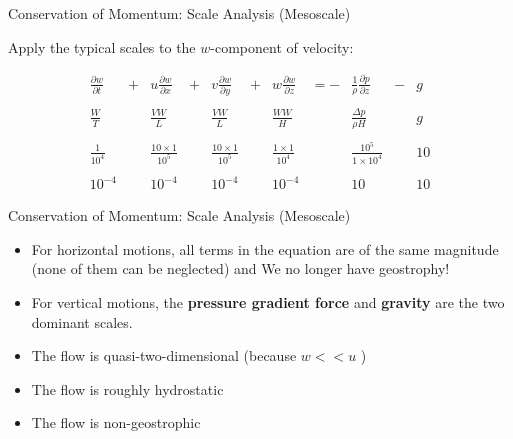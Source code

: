 \begin{frame}{Conservation of Momentum: Scale Analysis (Mesoscale)}

Apply the typical scales to the $w$-component of velocity:

\begin{align*}
&\frac{\partial w}{\partial t}& + &u \frac{\partial w}{\partial x}& + &v \frac{\partial w}{\partial y}&+ &w \frac{\partial w}{\partial z}& = -& \frac{1}{\rho} \frac{\partial p}{\partial z}& - &g& \\\\
&\frac{W}{T}&  &\frac{VW}{L}& &\frac{VW}{L}& &\frac{WW}{H}& &\frac{\Delta p}{\rho H}& &g&\\\\
&\frac{1}{10^4}& &\frac{10\times1}{10^5}& &\frac{10\times1}{10^5}& &\frac{1 \times 1}{10^4}& &\frac{10^5}{1 \times 10^4}& &10&\\\\
&10^{-4}& &10^{-4}& &10^{-4}& &10^{-4}& &10& &10&
\end{align*}
\end{frame}

\begin{frame}{Conservation of Momentum: Scale Analysis (Mesoscale)}

\begin{itemize}
	\item For horizontal motions, all terms in the equation are of the same magnitude (none of them can be neglected) and We no longer have geostrophy!
	\item For vertical motions, the \textbf{pressure gradient force} and \textbf{gravity} are the two dominant scales.
	\item The flow is quasi-two-dimensional (because $w << u$ )
	\item The flow is roughly hydrostatic
	\item The flow is non-geostrophic
\end{itemize}

\end{frame}

